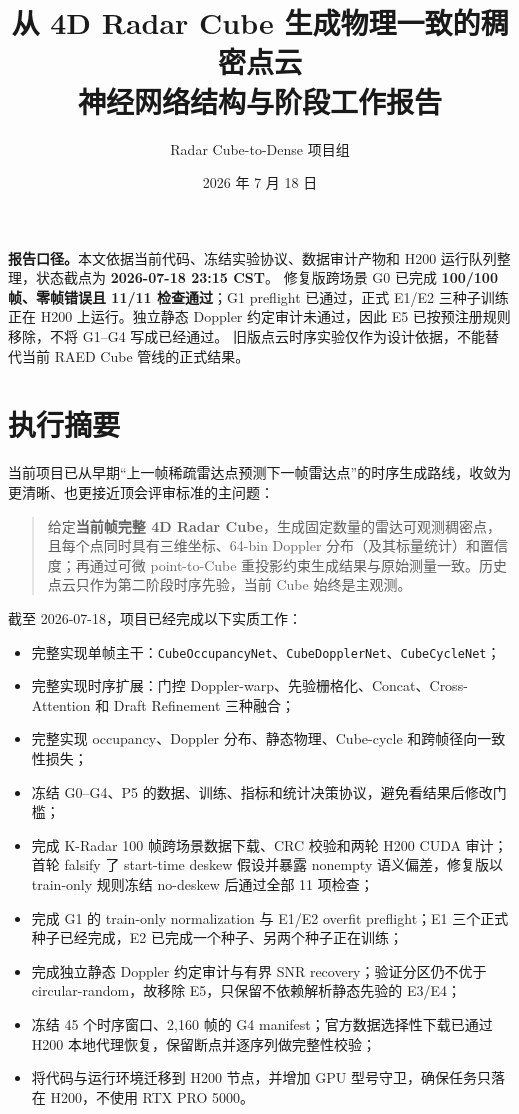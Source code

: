 \documentclass[11pt,a4paper,fontset=none]{ctexart}
\title{\bfseries 从 4D Radar Cube 生成物理一致的稠密点云\\[0.4em]
\large 神经网络结构与阶段工作报告}
\author{Radar Cube-to-Dense 项目组}
\date{2026 年 7 月 18 日}
\newcommand{\code}[1]{\texttt{#1}}
\begin{document}
\maketitle

\begin{center}
\begin{minipage}{0.94\textwidth}
\small
\textbf{报告口径。}本文依据当前代码、冻结实验协议、数据审计产物和 H200 运行队列整理，状态截点为 \textbf{2026-07-18 23:15 CST}。
修复版跨场景 G0 已完成 \textbf{100/100 帧、零帧错误且 11/11 检查通过}；G1 preflight 已通过，正式 E1/E2 三种子训练正在 H200 上运行。独立静态 Doppler 约定审计未通过，因此 E5 已按预注册规则移除，不将 G1--G4 写成已经通过。
旧版点云时序实验仅作为设计依据，不能替代当前 RAED Cube 管线的正式结果。
\end{minipage}
\end{center}

\tableofcontents
\newpage

\section{执行摘要}

当前项目已从早期“上一帧稀疏雷达点预测下一帧雷达点”的时序生成路线，收敛为更清晰、也更接近顶会评审标准的主问题：
\begin{quote}
给定\textbf{当前帧完整 4D Radar Cube}，生成固定数量的雷达可观测稠密点，且每个点同时具有三维坐标、64-bin Doppler 分布（及其标量统计）和置信度；再通过可微 point-to-Cube 重投影约束生成结果与原始测量一致。历史点云只作为第二阶段时序先验，当前 Cube 始终是主观测。
\end{quote}

截至 2026-07-18，项目已经完成以下实质工作：
\begin{itemize}
  \item 完整实现单帧主干：\code{CubeOccupancyNet}、\code{CubeDopplerNet}、\code{CubeCycleNet}；
  \item 完整实现时序扩展：门控 Doppler-warp、先验栅格化、Concat、Cross-Attention 和 Draft Refinement 三种融合；
  \item 完整实现 occupancy、Doppler 分布、静态物理、Cube-cycle 和跨帧径向一致性损失；
  \item 冻结 G0--G4、P5 的数据、训练、指标和统计决策协议，避免看结果后修改门槛；
  \item 完成 K-Radar 100 帧跨场景数据下载、CRC 校验和两轮 H200 CUDA 审计；首轮 falsify 了 start-time deskew 假设并暴露 nonempty 语义偏差，修复版以 train-only 规则冻结 no-deskew 后通过全部 11 项检查；
  \item 完成 G1 的 train-only normalization 与 E1/E2 overfit preflight；E1 三个正式种子已经完成，E2 已完成一个种子、另两个种子正在训练；
  \item 完成独立静态 Doppler 约定审计与有界 SNR recovery；验证分区仍不优于 circular-random，故移除 E5，只保留不依赖解析静态先验的 E3/E4；
  \item 冻结 45 个时序窗口、2,160 帧的 G4 manifest；官方数据选择性下载已通过 H200 本地代理恢复，保留断点并逐序列做完整性校验；
  \item 将代码与运行环境迁移到 H200 节点，并增加 GPU 型号守卫，确保任务只落在 H200，不使用 RTX PRO 5000。
\end{itemize}
\end{document}
